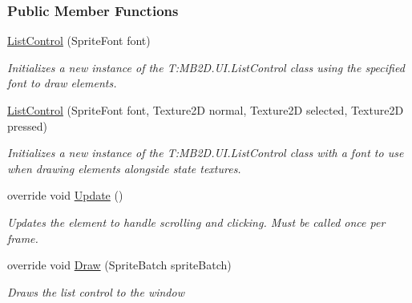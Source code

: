 \subsubsection*{Public Member Functions}
\begin{DoxyCompactItemize}
\item 
\hyperlink{class_m_b2_d_1_1_u_i_1_1_list_control_a7248e2ea186e805d76e9c6c84986f85c}{List\+Control} (Sprite\+Font font)
\begin{DoxyCompactList}\small\item\em Initializes a new instance of the T\+:\+M\+B2\+D.\+U\+I.\+List\+Control class using the specified font to draw elements. \end{DoxyCompactList}\item 
\hyperlink{class_m_b2_d_1_1_u_i_1_1_list_control_af89e91c17451a74cb0edbada9a1c0d17}{List\+Control} (Sprite\+Font font, Texture2D normal, Texture2D selected, Texture2D pressed)
\begin{DoxyCompactList}\small\item\em Initializes a new instance of the T\+:\+M\+B2\+D.\+U\+I.\+List\+Control class with a font to use when drawing elements alongside state textures. \end{DoxyCompactList}\item 
override void \hyperlink{class_m_b2_d_1_1_u_i_1_1_list_control_a48587bc052ca0d3d28bd968369024e14}{Update} ()
\begin{DoxyCompactList}\small\item\em Updates the element to handle scrolling and clicking. Must be called once per frame. \end{DoxyCompactList}\item 
override void \hyperlink{class_m_b2_d_1_1_u_i_1_1_list_control_a2ec92a77d8960945f3bd37bd76641946}{Draw} (Sprite\+Batch sprite\+Batch)
\begin{DoxyCompactList}\small\item\em Draws the list control to the window \end{DoxyCompactList}\end{DoxyCompactItemize}
